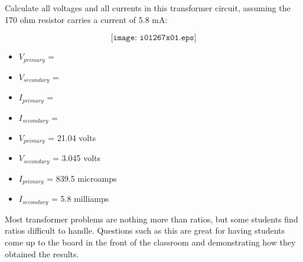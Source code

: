 

Calculate all voltages and all currents in this transformer circuit, assuming the 170 ohm resistor carries a current of 5.8 mA:

$$\texttt{[image: i01267x01.eps]}$$

\begin{itemize}
\item{} $V_{primary}$ = 
\item{} $V_{secondary}$ = 
\item{} $I_{primary}$ = 
\item{} $I_{secondary}$ = 
\end{itemize}







\begin{itemize}
\item{} $V_{primary}$ = 21.04 volts
\item{} $V_{secondary}$ = 3.045 volts
\item{} $I_{primary}$ = 839.5 microamps
\item{} $I_{secondary}$ = 5.8 milliamps
\end{itemize}







Most transformer problems are nothing more than ratios, but some students find ratios difficult to handle.  Questions such as this are great for having students come up to the board in the front of the classroom and demonstrating how they obtained the results.




